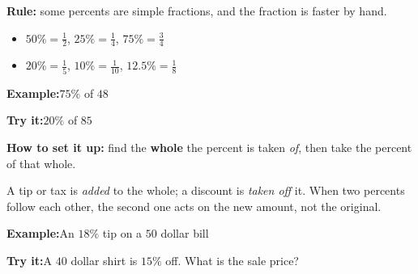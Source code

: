 \documentclass[12pt]{article}
\begin{document}
\begin{formulabox}
\textbf{Rule:} some percents are simple fractions, and the fraction is faster by hand.
\begin{itemize}[leftmargin=1cm, itemsep=1pt, topsep=2pt]
  \item $50\% = \frac{1}{2}$, \quad $25\% = \frac{1}{4}$, \quad $75\% = \frac{3}{4}$
  \item $20\% = \frac{1}{5}$, \quad $10\% = \frac{1}{10}$, \quad $12.5\% = \frac{1}{8}$
\end{itemize}
\end{formulabox}

\begin{examplebox}
\textbf{Example:}\quad $75\%$ of $48$
\end{examplebox}

\begin{tryitbox}
\textbf{Try it:}\quad $20\%$ of $85$\\[2pt]
\end{tryitbox}


\begin{formulabox}
\textbf{How to set it up:} find the \textbf{whole} the percent is taken \emph{of},
then take the percent of that whole.\par
A tip or tax is \emph{added} to the whole; a discount is \emph{taken off} it. When
two percents follow each other, the second one acts on the new amount, not the
original.
\end{formulabox}

\begin{examplebox}
\textbf{Example:}\quad An $18\%$ tip on a $50$ dollar bill
\end{examplebox}

\begin{tryitbox}
\textbf{Try it:}\quad A $40$ dollar shirt is $15\%$ off. What is the sale price?\\[2pt]
\end{tryitbox}
\end{document}
